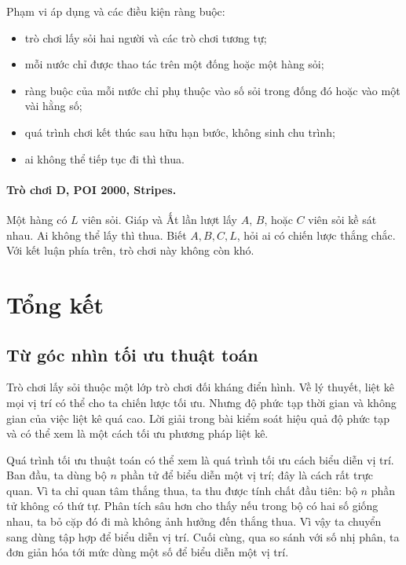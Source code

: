 \documentclass[11pt]{article}
\begin{document}
Phạm vi áp dụng và các điều kiện ràng buộc:
\begin{itemize}
  \item trò chơi lấy sỏi hai người và các trò chơi tương tự;
  \item mỗi nước chỉ được thao tác trên một đống hoặc một hàng sỏi;
  \item ràng buộc của mỗi nước chỉ phụ thuộc vào số sỏi trong đống đó hoặc
  vào một vài hằng số;
  \item quá trình chơi kết thúc sau hữu hạn bước, không sinh chu trình;
  \item ai không thể tiếp tục đi thì thua.
\end{itemize}

\paragraph{Trò chơi D, POI 2000, Stripes.}
Một hàng có \(L\) viên sỏi. Giáp và Ất lần lượt lấy \(A\), \(B\), hoặc \(C\)
viên sỏi kề sát nhau. Ai không thể lấy thì thua. Biết \(A,B,C,L\), hỏi ai có
chiến lược thắng chắc. Với kết luận phía trên, trò chơi này không còn khó.

\section{Tổng kết}

\subsection{Từ góc nhìn tối ưu thuật toán}

Trò chơi lấy sỏi thuộc một lớp trò chơi đối kháng điển hình. Về lý thuyết,
liệt kê mọi vị trí có thể cho ta chiến lược tối ưu. Nhưng độ phức tạp thời
gian và không gian của việc liệt kê quá cao. Lời giải trong bài kiểm soát
hiệu quả độ phức tạp và có thể xem là một cách tối ưu phương pháp liệt kê.

Quá trình tối ưu thuật toán có thể xem là quá trình tối ưu cách biểu diễn vị
trí. Ban đầu, ta dùng bộ \(n\) phần tử để biểu diễn một vị trí; đây là cách
rất trực quan. Vì ta chỉ quan tâm thắng thua, ta thu được tính chất đầu tiên:
bộ \(n\) phần tử không có thứ tự. Phân tích sâu hơn cho thấy nếu trong bộ có
hai số giống nhau, ta bỏ cặp đó đi mà không ảnh hưởng đến thắng thua. Vì vậy
ta chuyển sang dùng tập hợp để biểu diễn vị trí. Cuối cùng, qua so sánh với
số nhị phân, ta đơn giản hóa tới mức dùng một số để biểu diễn một vị trí.
\end{document}
